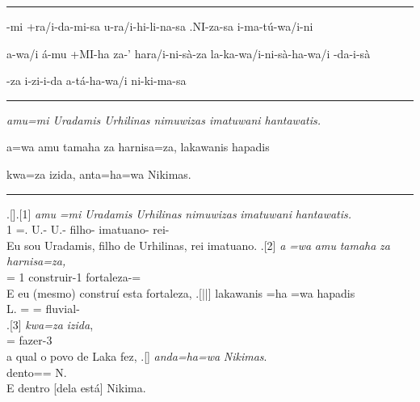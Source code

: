 \vspace{10pt}
\hrule
\vspace{10pt}

\setcounter{parcount}{0}
\begin{parnumbersa}[]

	\raggedright%
	\itshape%

	-mi
	+ra/i-da-mi-sa
	u-ra/i-hi-li-na-sa
	.NI-za-sa
	i-ma-tú-wa/i-ni 

	a-wa/i á-mu +MI-ha za-' hara/i-ni-sà-za
	la-ka-wa/i-ni-sà-ha-wa/i -da-i-sà

	-za i-zi-i-da a-tá-ha-wa/i ni-ki-ma-sa


\end{parnumbersa}

\vspace{10pt}
\hrule
\vspace{10pt}


\setcounter{parcount}{0}
\begin{parnumbersa}[]

	\raggedright%
	\itshape%
	amu=mi Uradamis Urhilinas nimuwizas imatuwani hantawatis.

	a=wa amu tamaha za harnisa=za, lakawanis hapadis

	kwa=za izida, anta=ha=wa Nikimas.


\end{parnumbersa}

\vspace{10pt}
\hrule
\vspace{20pt}



\ex.[]\ag.[1] \emph{amu} \emph{=mi} \emph{Uradamis} \emph{Urhilinas}
\emph{nimuwizas} \emph{imatuwani} \emph{hantawatis.}\\
\Pro{}1\Sg{} =\Refl{}. U.-\Com{}\Nom{}\Sg{} U.-\Com{}\Gen{}\Sg{} filho-\Com{}\Nom{}\Sg{}
imatuano-\Com{}\Nom{}\Sg{} rei-\Com{}\Nom{}\Sg{}\\
Eu sou Uradamis, filho de Urhilinas, rei imatuano.
\bg.[2] \emph{a} \emph{=wa} \emph{amu} \emph{tamaha} \emph{za} \emph{harnisa=za,}\\
\Conj{} =\Clt{} \Pro{}1\Sg{} construir-1\Sg{}\Pret{} \Pro{}\Neut{}\Acu{}\Sg{}
fortaleza-\Neut{}\Acu{}\Sg{}=\Clt{}\\
E eu (mesmo) construí esta fortaleza,
\bg.[||] lakawanis =ha =wa hapadis\\
L.\Com{}\Nom{}\Sg{} =\Conj{} =\Clt{} fluvial-\Com{}\Nom{}\Sg{}\\
\bg.[3] \emph{kwa=za} \emph{izida},\\
\Rel{}\Neut{}\Acu{}\Sg{}=\Clt{} fazer-3\Sg{}\Pret{}\\
a qual o povo de Laka fez,
\bg.[] \emph{anda=ha=wa} \emph{Nikimas}.\\
dento=\Conj{}=\Clt{} N.\Com{}\Nom{}\Sg{}\\
E dentro [dela está] Nikima.



